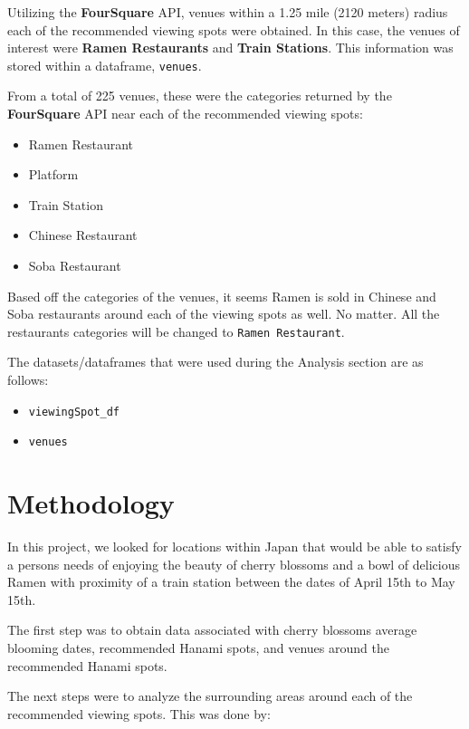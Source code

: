 \documentclass[11pt]{article}
\providecommand{\tightlist}{%
      \setlength{\itemsep}{0pt}\setlength{\parskip}{0pt}}
\begin{document}
Utilizing the \textbf{FourSquare} API, venues within a 1.25 mile (2120 meters) radius each of the recommended viewing spots were obtained.
In this case, the venues of interest were \textbf{Ramen Restaurants} and \textbf{Train Stations}. This information was stored within a dataframe,
\texttt{venues}.



From a total of 225 venues, these were the categories returned by the \textbf{FourSquare} API near each of the recommended viewing spots:

\begin{itemize}
\tightlist
  \item Ramen Restaurant
  \item Platform
  \item Train Station
  \item Chinese Restaurant
  \item Soba Restaurant
\end{itemize}

Based off the categories of the venues, it seems Ramen is sold in Chinese and Soba restaurants around each of the viewing spots as well.
No matter. All the restaurants categories will be changed to \texttt{Ramen\ Restaurant}.

The datasets/dataframes that were used during the Analysis section are as follows:

\begin{itemize}
\tightlist 
\item \texttt{viewingSpot\_df}
\item \texttt{venues}
\end{itemize}

    \hypertarget{methodology}{%
\section{Methodology}}\label{methodology}

In this project, we looked for locations within Japan that would be able to satisfy a persons needs of enjoying the beauty of
cherry blossoms and a bowl of delicious Ramen with proximity of a train station between the dates of April 15th to May 15th.

The first step was to obtain data associated with cherry blossoms average blooming dates, recommended Hanami spots, and venues around the
recommended Hanami spots.

The next steps were to analyze the surrounding areas around each of the recommended viewing spots. This was done by:
\end{document}
